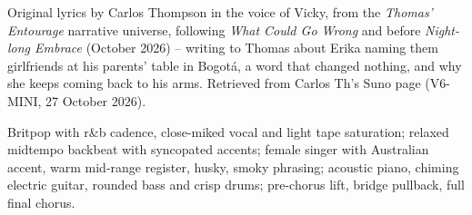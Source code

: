 
\begin{notes}
Original lyrics by Carlos Thompson in the voice of Vicky, from the \emph{Thomas' Entourage} narrative universe, following \emph{What Could Go Wrong} and before \emph{Night-long Embrace} (October 2026) -- writing to Thomas about Erika naming them girlfriends at his parents' table in Bogotá, a word that changed nothing, and why she keeps coming back to his arms. Retrieved from Carlos Th's Suno page (V6-MINI, 27 October 2026).
\end{notes}
\begin{style}
Britpop with r\&b cadence, close-miked vocal and light tape saturation; relaxed midtempo backbeat with syncopated accents; female singer with Australian accent, warm mid-range register, husky, smoky phrasing; acoustic piano, chiming electric guitar, rounded bass and crisp drums; pre-chorus lift, bridge pullback, full final chorus.
\end{style}
